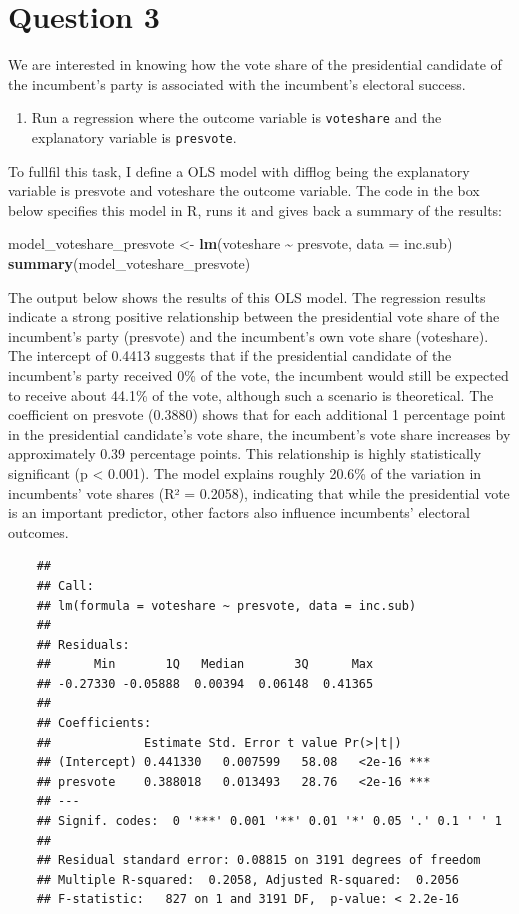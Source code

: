 \documentclass[
]{article}
\newenvironment{Shaded}{\begin{snugshade}}{\end{snugshade}}
\newcommand{\AttributeTok}[1]{\textcolor[rgb]{0.13,0.29,0.53}{#1}}
\newcommand{\FunctionTok}[1]{\textcolor[rgb]{0.13,0.29,0.53}{\textbf{#1}}}
\newcommand{\NormalTok}[1]{#1}
\newcommand{\OtherTok}[1]{\textcolor[rgb]{0.56,0.35,0.01}{#1}}
\newcommand{\SpecialCharTok}[1]{\textcolor[rgb]{0.81,0.36,0.00}{\textbf{#1}}}
\begin{document}
\section*{Question 3}

\noindent We are interested in knowing how the vote share of the presidential candidate of the incumbent's party is associated with the incumbent's electoral success.
\vspace{.5cm}
\begin{enumerate}
	\item Run a regression where the outcome variable is \texttt{voteshare} and the explanatory variable is \texttt{presvote}.
\end{enumerate}
To fullfil this task, I define a OLS model with difflog being the explanatory variable is presvote and voteshare the outcome variable. The code in the box below specifies this model in R, runs it and gives back a summary of the results:
\begin{Shaded}
	\begin{Highlighting}[]
\NormalTok{model\_voteshare\_presvote }\OtherTok{\textless{}{-}} \FunctionTok{lm}\NormalTok{(voteshare }\SpecialCharTok{\textasciitilde{}}\NormalTok{ presvote, }\AttributeTok{data =}\NormalTok{ inc.sub)}
\FunctionTok{summary}\NormalTok{(model\_voteshare\_presvote)}
	\end{Highlighting}
\end{Shaded}

The output below shows the results of this OLS model. The regression results indicate a strong positive relationship between the presidential vote share of the incumbent’s party (presvote) and the incumbent’s own vote share (voteshare). The intercept of 0.4413 suggests that if the presidential candidate of the incumbent’s party received 0\% of the vote, the incumbent would still be expected to receive about 44.1\% of the vote, although such a scenario is theoretical. The coefficient on presvote (0.3880) shows that for each additional 1 percentage point in the presidential candidate’s vote share, the incumbent’s vote share increases by approximately 0.39 percentage points. This relationship is highly statistically significant (p < 0.001). The model explains roughly 20.6\% of the variation in incumbents’ vote shares (R² = 0.2058), indicating that while the presidential vote is an important predictor, other factors also influence incumbents’ electoral outcomes. 
\begin{verbatim}
	## 
	## Call:
	## lm(formula = voteshare ~ presvote, data = inc.sub)
	## 
	## Residuals:
	##      Min       1Q   Median       3Q      Max 
	## -0.27330 -0.05888  0.00394  0.06148  0.41365 
	## 
	## Coefficients:
	##             Estimate Std. Error t value Pr(>|t|)    
	## (Intercept) 0.441330   0.007599   58.08   <2e-16 ***
	## presvote    0.388018   0.013493   28.76   <2e-16 ***
	## ---
	## Signif. codes:  0 '***' 0.001 '**' 0.01 '*' 0.05 '.' 0.1 ' ' 1
	## 
	## Residual standard error: 0.08815 on 3191 degrees of freedom
	## Multiple R-squared:  0.2058, Adjusted R-squared:  0.2056 
	## F-statistic:   827 on 1 and 3191 DF,  p-value: < 2.2e-16
\end{verbatim}
\vspace{.5cm} \newpage
\end{document}
